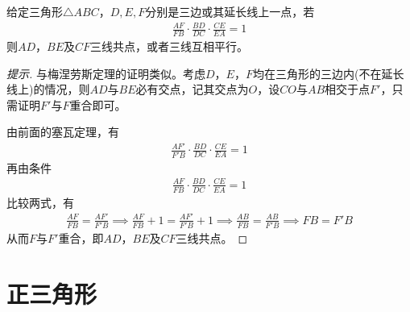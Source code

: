\begin{theorem}
  给定三角形$\triangle ABC$，$D,E,F$分别是三边或其延长线上一点，若
  \begin{align*}
    \frac{AF}{FB}\cdot\frac{BD}{DC}\cdot\frac{CE}{EA}=1
  \end{align*}
  则$AD$，$BE$及$CF$三线共点，或者三线互相平行。
  \begin{center}
  \end{center}
\end{theorem}
\begin{proof}[提示]
  与梅涅劳斯定理的证明类似。考虑$D$，$E$，$F$均在三角形的三边内(不在延长线上)的情况，则$AD$与$BE$必有交点，记其交点为$O$，设$CO$与$AB$相交于点$F'$，只需证明$F'$与$F$重合即可。

  由前面的塞瓦定理，有
  \begin{align*}
    \frac{AF'}{F'B}\cdot\frac{BD}{DC}\cdot\frac{CE}{EA}=1
  \end{align*}
  再由条件
  \begin{align*}
    \frac{AF}{FB}\cdot\frac{BD}{DC}\cdot\frac{CE}{EA}=1
  \end{align*}
  比较两式，有
  \begin{align*}
    \frac{AF}{FB}=\frac{AF'}{F'B} \implies
    \frac{AF}{FB}+1=\frac{AF'}{F'B}+1 \implies
    \frac{AB}{FB}=\frac{AB}{F'B} \implies 
    FB=F'B
  \end{align*}
  从而$F$与$F'$重合，即$AD$，$BE$及$CF$三线共点。
\end{proof}

\section{正三角形}
\label{sec:equilateral-triangle}

